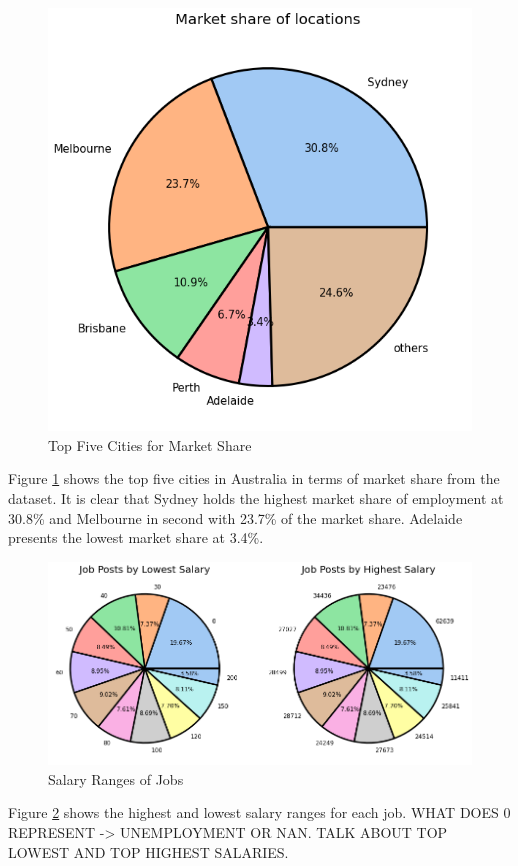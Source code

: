 \documentclass[twoside, 12pt, a4paper]{article}
\begin{document}
\begin{figure}[h!]
	\centering
	\includegraphics[scale = 0.58]{TopCities.png}
	\caption{Top Five Cities for Market Share}
	\label{fig:TopFiveCities}
\end{figure}

Figure \ref{fig:TopFiveCities} shows the top five cities in Australia in terms of market share from the dataset. It is clear that Sydney holds the highest market share of employment at 30.8\% and Melbourne in second with 23.7\% of the market share. Adelaide presents the lowest market share at 3.4\%. 

\newpage
\begin{figure}[h!]
	\centering
	\includegraphics[scale = 0.55]{SalaryRanges.png}
	\caption{Salary Ranges of Jobs}
	\label{fig:SalaryRanges}
\end{figure}

Figure \ref{fig:SalaryRanges} shows the highest and lowest salary ranges for each job. WHAT DOES 0 REPRESENT -> UNEMPLOYMENT OR NAN. TALK ABOUT TOP LOWEST AND TOP HIGHEST SALARIES. 
\end{document}

